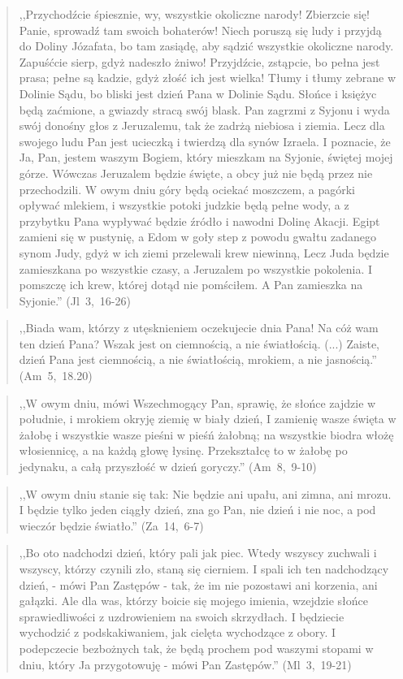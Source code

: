 \documentclass[10pt,a4paper,oneside]{article}
\begin{document}
\begin{quote}
,,Przychodźcie śpiesznie, wy, wszystkie okoliczne narody! Zbierzcie się! Panie, sprowadź tam swoich bohaterów! Niech poruszą się ludy i przyjdą do Doliny Józafata, bo tam zasiądę, aby sądzić wszystkie okoliczne narody. Zapuśćcie sierp, gdyż nadeszło żniwo! Przyjdźcie, zstąpcie, bo pełna jest prasa; pełne są kadzie, gdyż złość ich jest wielka! Tłumy i tłumy zebrane w Dolinie Sądu, bo bliski jest dzień Pana w Dolinie Sądu. Słońce i księżyc będą zaćmione, a gwiazdy stracą swój blask. Pan zagrzmi z Syjonu i wyda swój donośny głos z Jeruzalemu, tak że zadrżą niebiosa i ziemia. Lecz dla swojego ludu Pan jest ucieczką i twierdzą dla synów Izraela. I poznacie, że Ja, Pan, jestem waszym Bogiem, który mieszkam na Syjonie, świętej mojej górze. Wówczas Jeruzalem będzie święte, a obcy już nie będą przez nie przechodzili. W owym dniu góry będą ociekać moszczem, a pagórki opływać mlekiem, i wszystkie potoki judzkie będą pełne wody, a z przybytku Pana wypływać będzie źródło i nawodni Dolinę Akacji. Egipt zamieni się w pustynię, a Edom w goły step z powodu gwałtu zadanego synom Judy, gdyż w ich ziemi przelewali krew niewinną, Lecz Juda będzie zamieszkana po wszystkie czasy, a Jeruzalem po wszystkie pokolenia. I pomszczę ich krew, której dotąd nie pomściłem. A Pan zamieszka na Syjonie.'' \mbox{(Jl 3, 16-26)}
\end{quote}
\begin{quote}
,,Biada wam, którzy z utęsknieniem oczekujecie dnia Pana! Na cóż wam ten dzień Pana? Wszak jest on ciemnością, a nie światłością. (...) Zaiste, dzień Pana jest ciemnością, a nie światłością, mrokiem, a nie jasnością.'' \mbox{(Am 5, 18.20)}
\end{quote}
\begin{quote}
,,W owym dniu, mówi Wszechmogący Pan, sprawię, że słońce zajdzie w południe, i mrokiem okryję ziemię w biały dzień, I zamienię wasze święta w żałobę i wszystkie wasze pieśni w pieśń żałobną; na wszystkie biodra włożę włosiennicę, a na każdą głowę łysinę. Przekształcę to w żałobę po jedynaku, a całą przyszłość w dzień goryczy.'' \mbox{(Am 8, 9-10)}
\end{quote}
\begin{quote}
,,W owym dniu stanie się tak: Nie będzie ani upału, ani zimna, ani mrozu. I będzie tylko jeden ciągły dzień, zna go Pan, nie dzień i nie noc, a pod wieczór będzie światło.'' \mbox{(Za 14, 6-7)}
\end{quote}
\begin{quote}
,,Bo oto nadchodzi dzień, który pali jak piec. Wtedy wszyscy zuchwali i wszyscy, którzy czynili zło, staną się cierniem. I spali ich ten nadchodzący dzień, - mówi Pan Zastępów - tak, że im nie pozostawi ani korzenia, ani gałązki. Ale dla was, którzy boicie się mojego imienia, wzejdzie słońce sprawiedliwości z uzdrowieniem na swoich skrzydłach. I będziecie wychodzić z podskakiwaniem, jak cielęta wychodzące z obory. I podepczecie bezbożnych tak, że będą prochem pod waszymi stopami w dniu, który Ja przygotowuję - mówi Pan Zastępów.'' \mbox{(Ml 3, 19-21)}
\end{quote}
\end{document}
